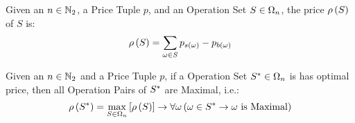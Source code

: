 \begin{defn}
    Given an $n \in \mathbb{N}_{2}$, a Price Tuple $p$, and an Operation Set $S \in \Omega_{n}$, the price $\rho\left( S \right)$ of $S$ is:
    \begin{equation}
        \rho\left( S \right) = \displaystyle\sum\limits_{\omega \in S} p_{s\left( \omega \right)} - p_{b\left( \omega \right)}
    \end{equation}
\end{defn}

\begin{lemma}
    \label{lemma:opt-price-I}
    Given an $n \in \mathbb{N}_{2}$ and a Price Tuple $p$, if a Operation Set $S^{*} \in \Omega_{n}$ is has optimal price, then all Operation Pairs of $S^{*}$ are Maximal, i.e.:
    \begin{align}
        \rho\left( S^{*} \right) = \max\limits_{S \in \Omega_{n}} \left[ \rho\left( S \right) \right]
        \rightarrow
        \forall \omega \left( \omega \in S^{*} \rightarrow \omega \mbox{ is Maximal} \right)
    \end{align}
\end{lemma}

